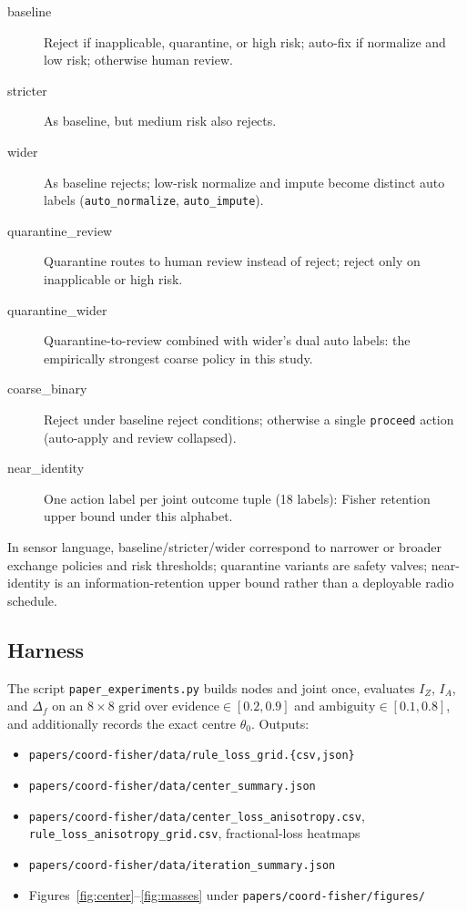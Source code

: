 \documentclass[11pt,a4paper]{article}
\begin{document}
\begin{description}
  \item[baseline] Reject if inapplicable, quarantine, or high risk; auto-fix
  if normalize and low risk; otherwise human review.
  \item[stricter] As baseline, but medium risk also rejects.
  \item[wider] As baseline rejects; low-risk normalize and impute become distinct
  auto labels (\texttt{auto\_normalize}, \texttt{auto\_impute}).
  \item[quarantine\_review] Quarantine routes to human review instead of reject;
  reject only on inapplicable or high risk.
  \item[quarantine\_wider] Quarantine-to-review combined with wider's dual auto
  labels: the empirically strongest coarse policy in this study.
  \item[coarse\_binary] Reject under baseline reject conditions; otherwise a
  single \texttt{proceed} action (auto-apply and review collapsed).
  \item[near\_identity] One action label per joint outcome tuple (18 labels):
  Fisher retention upper bound under this alphabet.
\end{description}

In sensor language, baseline/stricter/wider correspond to narrower or broader
exchange policies and risk thresholds; quarantine variants are safety valves;
near-identity is an information-retention upper bound rather than a deployable
radio schedule.

\subsection{Harness}

The script \texttt{paper\_experiments.py} builds nodes and joint once, evaluates
$I_Z$, $I_A$, and $\Delta_f$ on an $8\times 8$ grid over
$\mathrm{evidence}\in[0.2,0.9]$ and $\mathrm{ambiguity}\in[0.1,0.8]$, and
additionally records the exact centre $\theta_0$. Outputs:

\begin{itemize}
  \item \texttt{papers/coord-fisher/data/rule\_loss\_grid.\{csv,json\}}
  \item \texttt{papers/coord-fisher/data/center\_summary.json}
  \item \texttt{papers/coord-fisher/data/center\_loss\_anisotropy.csv},
  \texttt{rule\_loss\_anisotropy\_grid.csv}, fractional-loss heatmaps
  \item \texttt{papers/coord-fisher/data/iteration\_summary.json}
  \item Figures~\ref{fig:center}--\ref{fig:masses} under
  \texttt{papers/coord-fisher/figures/}
\end{itemize}
\end{document}
